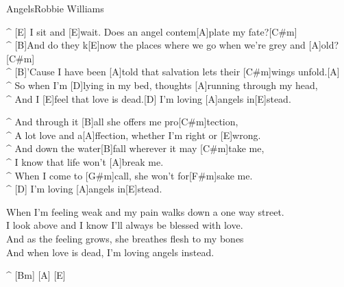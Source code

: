 \begin{song}{Angels}{Robbie Williams}

\begin{guitar}
^ [E]  I sit and [E]wait. Does an angel contem[A]plate my fate?[C#m]\\
^ [B]And do they k[E]now the places where we go when we're grey and [A]old?[C#m]\\
^ [B]'Cause I have been [A]told that salvation lets their [C#m]wings unfold.[A]\\
^ So when I'm [D]lying in my bed, thoughts [A]running through my head,\\
^ And I [E]feel that love is dead.[D] I'm loving [A]angels in[E]stead.\\
\end{guitar}

\newpage
{}
\begin{guitar}
^ And through it [B]all she offers me pro[C#m]tection, \\
^ A lot love and a[A]ffection, whether I'm right or [E]wrong.\\
^ And down the water[B]fall wherever it may [C#m]take me,\\
^ I know that life won't [A]break me.\\
^ When I come to [G#m]call, she won't for[F#m]sake me.\\
^ [D] I'm loving [A]angels in[E]stead.\\
\end{guitar}

\begin{guitar}
When I'm feeling weak and my pain walks down a one way street.\\
I look above and I know I'll always be blessed with love.\\
And as the feeling grows, she breathes flesh to my bones\\
And when love is dead, I'm loving angels instead.\\
\end{guitar}


\begin{guitar}
^ [Bm] [A] [E]\\
\end{guitar}


\end{song}
